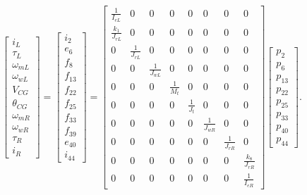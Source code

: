 \begin{equation}\label{1_matrix2}
\left[
\begin{array}{c}{i_{L}} \\ {\tau_{L}}  \\ {\omega_{mL}}\\ {\omega_{wL}} \\ {V_{C G}} \\ {\theta_{C G}}\\ {\omega_{mR}}\\ {\omega_{wR}}\\{\tau_{R}} \\ {i_{R}}
\end{array}
\right]
=
\left[
\begin{array}{c}{i_{2}} \\ {e_{6}} \\ {f_{8}} \\ {f_{13}}\\ {f_{22}} \\ {f_{25}}\\ {f_{33}}\\ {f_{39}}\\ {e_{40}}\\ {i_{44}}\end{array}
\right]
=
\left[ \begin{array}{cccccccc}
{\frac{1}{I_{e L}}} & {0} & {0} & {0} & {0} & {0} & {0} & {0} \\
 {\frac{k_1}{J_{r L}}} & 0 & {0} & {0}& {0} & {0} & {0} & {0} \\  
0 & {\frac{1}{J_{r L}}} &0 & {0}& {0} & {0} & {0} & {0}  \\ 
 {0} & {0} & {\frac{1}{J_{w L}}} & 0& {0} & {0} & {0} & {0} \\
 {0} & {0} & {0} & {\frac{1}{M_{t}}}& {0} & {0} & {0} & {0} \\
 {0} & {0} & {0} & {0} &{\frac{1}{J_{t}}}& {0} & {0} & {0}\\
 {0} & {0} & {0} &0& {0} & {\frac{1}{J_{wR}}} & {0} & {0} \\
  {0} & {0} & {0} &0& {0} & 0 & {\frac{1}{J_{rR}}} & {0} \\
    {0} & {0} & {0} &0& {0} & 0 & 0& {\frac{k_8}{J_{rR}}}  \\
     {0} & {0} & {0} &0& {0} & 0 & 0& {\frac{1}{I_{eR}}} 
\end{array}\right] 
\left[ \begin{array}{c}
{p_{2}} \\ {p_{6}} \\ {p_{13}} \\ {p_{22}}\\{p_{25}} \\ {p_{33}} \\ {p_{40}} \\ {p_{44}}
\end{array}\right].
\end{equation}

